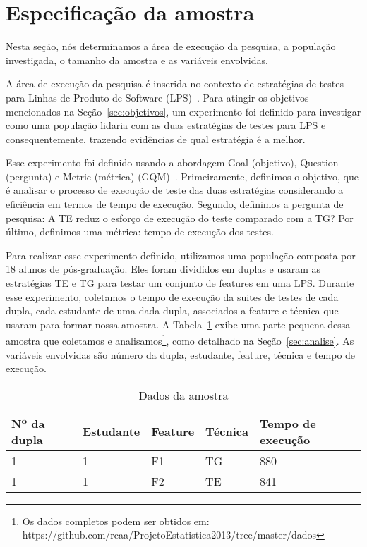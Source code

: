 \section{Especifica\c{c}\~ao da amostra}
\label{sec:especificacao}


Nesta seção, nós determinamos a área de execução da pesquisa, a população investigada, o tamanho da amostra e as variáveis envolvidas.

A área de execução da pesquisa é inserida no contexto de estratégias de testes para Linhas de Produto de Software (LPS)~\cite{pohl-book}. Para atingir os objetivos mencionados na Seção~\ref{sec:objetivos}, um experimento foi definido para investigar como uma população lidaria com as duas estratégias de testes para LPS e consequentemente, trazendo evidências de qual estratégia é a melhor.

Esse experimento foi definido usando a abordagem Goal (objetivo), Question (pergunta) e Metric (métrica) (GQM)~\cite{gqm}. Primeiramente, definimos o objetivo, que é analisar o processo de execução de teste das duas estratégias considerando a eficiência em termos de tempo de execução. Segundo, definimos a pergunta de pesquisa: A TE reduz o esforço de execução do teste comparado com a TG? Por último, definimos uma métrica: tempo de execução dos testes.

Para realizar esse experimento definido, utilizamos uma população composta por 18 alunos de pós-graduação. Eles foram divididos em duplas e usaram as estratégias TE e TG para testar um conjunto de features em uma LPS. Durante esse experimento, coletamos o tempo de execução da suites de testes de cada dupla, cada estudante de uma dada dupla, associados a feature e técnica que usaram para formar nossa amostra. A Tabela~\ref{tab:amostra} exibe uma parte pequena dessa amostra que coletamos e analisamos\footnote{Os dados completos podem ser obtidos em: https://github.com/rcaa/ProjetoEstatistica2013/tree/master/dados}, como detalhado na Seção~\ref{sec:analise}. As variáveis envolvidas são número da dupla, estudante, feature, técnica e tempo de execução.

\begin{table}[h]\footnotesize
    \caption{Dados da amostra}
    \centering
    \begin{tabular}{|l|l|l|l|l|}
    \addlinespace
    \hline
    {\bf Nº da dupla}  & {\bf Estudante} & {\bf Feature} & {\bf Técnica} & {\bf Tempo de execução}\\ \hline
    1 & 1 & F1 & TG & 880\\ \hline
    1 & 1 & F2 & TE & 841\\ \hline
    \end{tabular}
  \label{tab:amostra}
\end{table}

